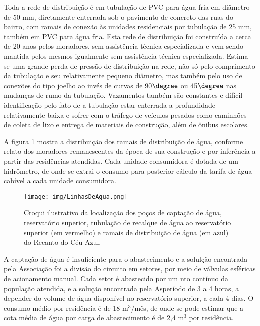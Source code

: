 Toda a rede de distribuição é em tubulação de PVC para água fria em diâmetro de 50 mm, diretamente enterrada sob o pavimento de concreto das ruas do bairro, com ramais de conexão às unidades residenciais por tubulação de 25 mm, também em PVC para água fria. Esta rede de distribuição foi construída a cerca de 20 anos pelos moradores, sem assistência técnica especializada e vem sendo mantida pelos mesmos igualmente sem assistência técnica especializada. Estima-se uma grande perda de pressão de distribuição na rede, não só pelo comprimento da tubulação e seu relativamente pequeno diâmetro, mas também pelo uso de conexões do tipo joelho ao invés de curvas de 90$\degree$ ou 45$\degree$ nas mudanças de rumo da tubulação. Vazamentos também são constantes e difícil identificação pelo fato de a tubulação estar enterrada a profundidade relativamente baixa e sofrer com o tráfego de veículos pesados como caminhões de coleta de lixo e entrega de materiais de construção, além de ônibus escolares.

A figura \ref{fig:LinhasDeAgua} mostra a distribuição dos ramais de distribuição de água, conforme relato dos moradores remanescentes da época de sua construção e por inferência a partir das residências atendidas. Cada unidade consumidora é dotada de um hidrômetro, de onde se extrai o consumo para posterior cálculo da tarifa de água cabível a cada unidade consumidora. 

\begin{figure}[htbp!]
    \centering
    \suppressfloats[t]
    \texttt{[image: img/LinhasDeAgua.png]}
    \caption{Croqui ilustrativo da localização dos poços de captação de água, reservatório superior, tubulação de recalque de água ao reservatório superior (em vermelho) e ramais de distribuição de água (em azul) do Recanto do Céu Azul.}
    \label{fig:LinhasDeAgua}
\end{figure}

A captação de água é insuficiente para o abastecimento e a solulção encontrada pela Associação foi a divisão do circuito em setores, por meio de válvulas esféricas de acionamento manual. Cada setor é abastecido por um nto contínuo da população atendida, e a solução encontrada pela Asperíodo de 3 a 4 horas, a depender do volume de água disponível no reservatório superior, a cada 4 dias. O consumo médio por residência é de 18 m$^3$/mês, de onde se pode estimar que a cota média de água por carga de abastecimento é de 2,4 m$^3$ por residência.

